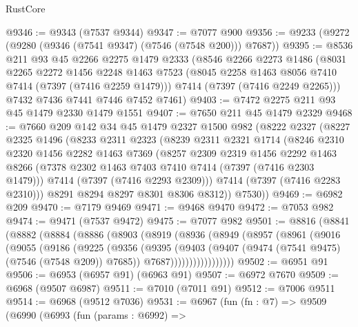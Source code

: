 \begin{lexlean}{RustCore}
\begin{coremodule}
@9346 := @9343 (@7537 @9344)
@9347 := @7077 @900
@9356 := @9233 (@9272 (@9280 (@9346 (@7541 @9347) (@7546 (@7548 @200))) @7687))
@9395 := @8536
    @211
    @93
    @45
    @2266
    @2275
    @1479
    @2333
    (@8546
      @2266
      @2273
      @1486
      (@8031
        @2265
        @2272
        @1456
        @2248
        @1463
        @7523
        (@8045 @2258 @1463 @8056 @7410 @7414 (@7397 (@7416 @2259 @1479)))
        @7414
        (@7397 (@7416 @2249 @2265)))
      @7432
      @7436
      @7441
      @7446
      @7452
      @7461)
@9403 := @7472 @2275 @211 @93 @45 @1479 @2330 @1479 @1551
@9407 := @7650 @211 @45 @1479 @2329
@9468 := @7660
    @209
    @142
    @34
    @45
    @1479
    @2327
    @1500
    @982
    (@8222
      @2327
      (@8227
        @2325
        @1496
        (@8233
          @2311
          @2323
          (@8239
            @2311
            @2321
            @1714
            (@8246
              @2310
              @2320
              @1456
              @2282
              @1463
              @7369
              (@8257
                @2309
                @2319
                @1456
                @2292
                @1463
                @8266
                (@7378 @2302 @1463 @7403 @7410 @7414 (@7397 (@7416 @2303 @1479)))
                @7414
                (@7397 (@7416 @2293 @2309)))
              @7414
              (@7397 (@7416 @2283 @2310)))
            @8291
            @8294
            @8297
            @8301
            @8306
            @8312))
        @7530))
@9469 := @6982 @209
@9470 := @7179 @9469
@9471 := @9468 @9470
@9472 := @7053 @982
@9474 := @9471 (@7537 @9472)
@9475 := @7077 @982
@9501 := @8816
    (@8841
      (@8882
        (@8884
          (@8886
            (@8903
              (@8919
                (@8936
                  (@8949
                    (@8957
                      (@8961
                        (@9016
                          (@9055
                            (@9186
                              (@9225
                                (@9356
                                  (@9395
                                    (@9403
                                      (@9407 (@9474 (@7541 @9475) (@7546 (@7548 @209)) @7685))
                                      @7687)))))))))))))))))
@9502 := @6951 @91
@9506 := @6953 (@6957 @91) (@6963 @91)
@9507 := @6972 @7670
@9509 := @6968 (@9507 @6987)
@9511 := @7010 (@7011 @91)
@9512 := @7006 @9511
@9514 := @6968 (@9512 @7036)
@9531 := @6967
    (fun (fn : @7) =>
    @9509
      (@6990
        (@6993
          (fun (params : @6992) =>

\end{coremodule}
\end{lexlean}
